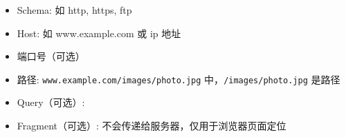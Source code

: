 
\begin{itemize}
\item Schema: 如 http, https, ftp
\item Host: 如 www.example.com 或 ip 地址
\item 端口号（可选）
\item 路径: \verb`www.example.com/images/photo.jpg` 中，\verb`/images/photo.jpg` 是路径
\item Query（可选）:
\item Fragment（可选）: 不会传递给服务器，仅用于浏览器页面定位
\end{itemize}
